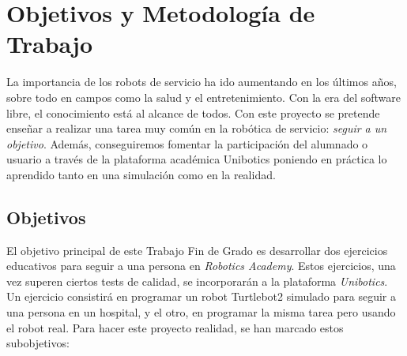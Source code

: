 \chapter{Objetivos y Metodología de Trabajo}
\label{cap:capitulo2}

La importancia de los robots de servicio ha ido aumentando en los últimos años, sobre todo en campos como la salud y el entretenimiento. Con la era del software libre, el conocimiento está al alcance de todos. Con este proyecto se pretende enseñar a realizar una tarea muy común en la robótica de servicio: \textit{seguir a un objetivo}. Además, conseguiremos fomentar la participación del alumnado o usuario a través de la plataforma académica Unibotics poniendo en práctica lo aprendido tanto en una simulación como en la realidad.




\section{Objetivos}
\label{sec:objetivos}
El objetivo principal de este Trabajo Fin de Grado es desarrollar dos ejercicios educativos para seguir a una persona en \textit{Robotics Academy}. Estos ejercicios, una vez superen ciertos tests de calidad, se incorporarán a la plataforma \textit{Unibotics}. Un ejercicio consistirá en programar un robot Turtlebot2 simulado para seguir a una persona en un hospital, y el otro, en programar la misma tarea pero usando el robot real. Para hacer este proyecto realidad, se han marcado estos subobjetivos:

